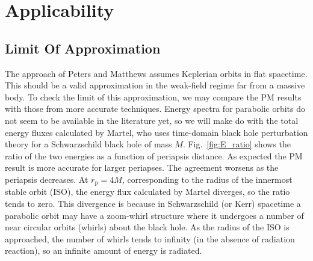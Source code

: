 \documentclass[aps,prd,reprint,showpacs,groupedaddress]{revtex4-1}
\newcommand{\Figref}[1]{Fig.~\ref{fig:#1}}
\newcommand{\sub}[1]{\ensuremath{_\text{#1}}}
\begin{document}
\section{Applicability\label{sec:application}}

\subsection{Limit Of Approximation}

The approach of Peters and Matthews assumes Keplerian orbits in flat spacetime. This should be a valid approximation in the weak-field regime far from a massive body. To check the limit of this approximation, we may compare the PM results with those from more accurate techniques. Energy spectra for parabolic orbits do not seem to be available in the literature yet, so we will make do with the total energy fluxes calculated by Martel\cite{Martel2004a}, who uses time-domain black hole perturbation theory for a Schwarzschild black hole of mass $M$. \Figref{E_ratio} shows the ratio of the two energies as a function of periapsis distance. As expected the PM result is more accurate for larger periapses. The agreement worsens as the periapsis decreases. At $r\sub{p} = 4 M$, corresponding to the radius of the innermost stable orbit (ISO), the energy flux calculated by Martel diverges, so the ratio tends to zero. This divergence is because in Schwarzschild (or Kerr) spacetime a parabolic orbit may have a zoom-whirl structure where it undergoes a number of near circular orbits (whirls) about the black hole. As the radius of the ISO is approached, the number of whirls tends to infinity (in the absence of radiation reaction), so an infinite amount of energy is radiated.
\end{document}
